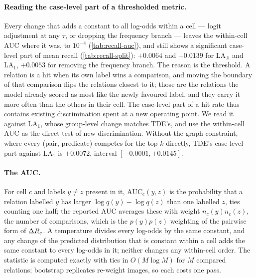 \paragraph{Reading the case-level part of a thresholded metric.} Every change that adds a
constant to all log-odds within a cell --- logit adjustment at any $\tau$, or dropping the
frequency branch --- leaves the within-cell AUC where it was, to $10^{-4}$ (\cref{tab:recall-auc}), and still shows a
significant case-level part of mean recall (\cref{tab:recall-split}): $+0.0064$ and $+0.0139$
for LA$_{.5}$ and LA$_1$, $+0.0053$ for removing the frequency branch. The reason is the
threshold. A relation is a hit when its own label wins a comparison, and moving the boundary
of that comparison flips the relations closest to it; those are the relations the model
already scored as most like the newly favoured label, and they carry it more often than the
others in their cell. The case-level part of a hit rate thus contains existing
discrimination spent at a new operating point. We read it against LA$_1$, whose group-level
change matches TDE's, and use the within-cell AUC as the direct test of new discrimination.
Without the graph constraint, where every (pair, predicate) competes for the top $k$
directly, TDE's case-level part against LA$_1$ is $+0.0072$, interval $[-0.0001,+0.0145]$.

\paragraph{The AUC.} For cell $c$ and labels $y\ne z$ present in it,
$\mathrm{AUC}_c(y,z)$ is the probability that a relation labelled $y$ has larger
$\log q(y)-\log q(z)$ than one labelled $z$, ties counting one half; the reported AUC
averages these with weight $n_c(y)n_c(z)$, the number of comparisons, which is the
$p(y)p(z)$ weighting of the pairwise form of $\Delta R_c$. A temperature divides every log-odds by
the same constant, and any change of the predicted distribution that is constant within a
cell adds the same constant to every log-odds in it; neither changes any within-cell order.
The statistic is computed exactly with ties in $O(M\log M)$ for $M$ compared relations;
bootstrap replicates re-weight images, so each costs one pass.

